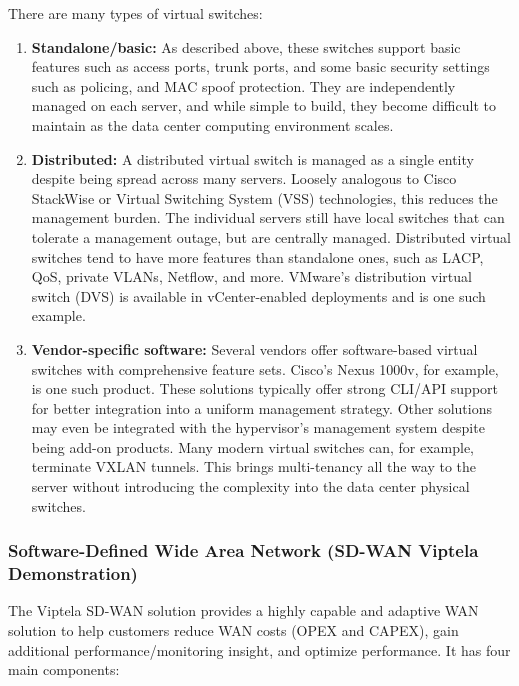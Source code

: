 There are many types of virtual switches:
\begin{enumerate}
  \item \textbf{Standalone/basic:} As described above, these switches support
  basic features such as access ports, trunk ports, and some basic security
  settings such as policing, and MAC spoof protection. They are independently
  managed on each server, and while simple to build, they become difficult to
  maintain as the data center computing environment scales.
  \item \textbf{Distributed:} A distributed virtual switch is managed as a
  single entity despite being spread across many servers. Loosely analogous to
  Cisco StackWise or Virtual Switching System (VSS) technologies, this reduces
  the management burden. The individual servers still have local switches that
  can tolerate a management outage, but are centrally managed. Distributed
  virtual switches tend to have more features than standalone ones, such as
  LACP, QoS, private VLANs, Netflow, and more. VMware's distribution virtual
  switch (DVS) is available in vCenter-enabled deployments and is one such example.
  \item \textbf{ Vendor-specific software:} Several vendors offer
  software-based virtual switches with comprehensive feature sets. Cisco's
  Nexus 1000v, for example, is one such product. These solutions typically
  offer strong CLI/API support for better integration into a uniform
  management strategy. Other solutions may even be integrated with the
  hypervisor's management system despite being add-on products. Many modern
  virtual switches can, for example, terminate VXLAN tunnels. This brings
  multi-tenancy all the way to the server without introducing the complexity
  into the data center physical switches.
\end{enumerate}

\subsubsection{Software-Defined Wide Area Network (SD-WAN Viptela Demonstration)}
The Viptela SD-WAN solution provides a highly capable and adaptive WAN
solution to help customers reduce WAN costs (OPEX and CAPEX), gain additional
performance/monitoring insight, and optimize performance. It has four main
components:


